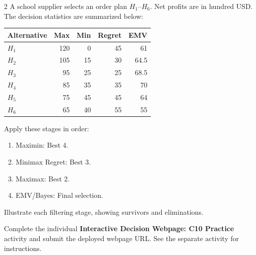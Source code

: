 \begin{multicols}{2}
		A school supplier selects an order plan $H_1$--$H_6$. Net profits are in hundred USD. The decision statistics are summarized below:
		\vspace{-3mm}
		\begin{center}\small\setlength{\tabcolsep}{4pt}
			\begin{tabular}{lrrrr}\toprule
				Alternative & Max & Min & Regret & EMV\\ \midrule
				$H_1$ & 120 & 0 & 45 & 61\\
				$H_2$ & 105 & 15 & 30 & 64.5\\
				$H_3$ & 95 & 25 & 25 & 68.5\\
				$H_4$ & 85 & 35 & 35 & 70\\
				$H_5$ & 75 & 45 & 45 & 64\\
				$H_6$ & 65 & 40 & 55 & 55\\
				\bottomrule
			\end{tabular}
		\end{center}
		\vspace{-3mm}
		Apply these stages in order:
		\begin{enumerate}[leftmargin=*]
			\item Maximin: Best 4.
			\item Minimax Regret: Best 3.
			\item Maximax: Best 2.
			\item EMV/Bayes: Final selection.
		\end{enumerate}
		Illustrate each filtering stage, showing survivors and eliminations.
		
		Complete the individual \textbf{Interactive Decision Webpage: C10 Practice} activity and submit the deployed webpage URL. See the separate activity for instructions.
		
	\end{multicols}

